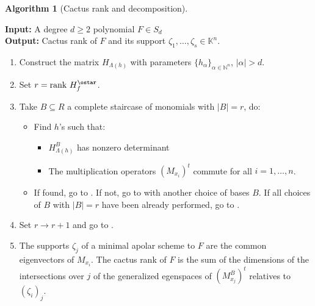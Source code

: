 \documentclass[a4paper,11p]{amsart}
\newtheorem{alg}{Algorithm}
\newcommand{\K}{\mathbb K}
\begin{document}
\vspace{0.5cm}
\begin{mdframed}[]
\begin{alg}[Cactus rank and decomposition]\label{alg:cactus}\end{alg}
\vspace{0.1cm}
\noindent\textbf{Input:} A degree $d \geq 2$ polynomial $F \in S_d$ \\
    \textbf{Output:} Cactus rank of $F$ and its support $\zeta_1, \ldots ,\zeta_s\in \K^n$.

\begin{enumerate}
    \item Construct the matrix $H_{\Lambda(h)}$ with parameters $\{h_{\alpha}\}_{\alpha\in \mathbb N^n}$, $|\alpha|>d$.
    \item\label{alg:H:star} Set $r=\text{rank } H_f^{\ostar}$.
    \item\label{alg:basis} Take $B\subseteq R$ a complete staircase of monomials with $|B|=r$, do: 
    \begin{itemize}
        \item\label{alg:h's} Find $h$'s such that:
        \begin{itemize}
            \item $H_{\Lambda(h)}^B$ has nonzero determinant
            \item The multiplication operators $(M_{x_i})^t$ commute for all $i=1,\ldots,n$.
        \end{itemize}
        \item If found, go to . If not, go to  with another choice of bases $B$. If all choices of $B$ with $|B|=r$ have been already performed, go to .
    \end{itemize}
    \item\label{increase:r} Set $r\to r+1$ and go to .
    \item\label{solutions} The supports $\zeta_j$ of a minimal apolar scheme to $F$ are the common eigenvectors of $M_{x_i}$. The cactus rank of $F$ is the sum of the dimensions of the intersections over $j$ of the generalized egenspaces of $(M_{x_j}^B)^t$ relatives to $(\zeta_i)_j$. %
\end{enumerate}
\end{mdframed}
\vspace{0.5cm}
\end{document}

